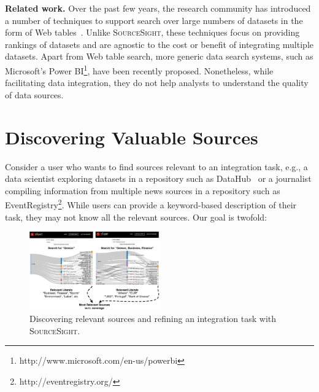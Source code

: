 \documentclass{sig-alternate-05-2015}
\newcommand\system{\textsc{SourceSight}}
\begin{document}
\noindent\textbf{Related work.} Over the past few years, the research community has introduced a number of techniques to support search over large numbers of datasets in the form of Web tables~\cite{limaye:2010,dassarma:2012}. Unlike \system, these techniques focus on providing rankings of datasets and are agnostic to the cost or benefit of integrating multiple datasets. Apart from Web table search, more generic data search systems, such as Microsoft's Power BI\footnote{http://www.microsoft.com/en-us/powerbi}, have been recently proposed. Nonetheless, while facilitating data integration, they do not help analysts to understand the quality of data sources.

\section{Discovering Valuable Sources}
\label{sec:sources}
Consider a user who wants to find sources relevant to an integration task, e.g., a data scientist exploring datasets in a repository such as DataHub~\cite{datahub} or a journalist compiling information from multiple news sources in a repository such as EventRegistry\footnote{http://eventregistry.org/}. While users can provide a keyword-based description of their task, they may not know all the relevant sources. Our goal is twofold: 

\begin{figure}
	\begin{center}
	\includegraphics[trim=0 0 0 60, clip,width=0.50\textwidth]{fig/exploreCor}
	\vspace{-20pt}
	\caption{Discovering relevant sources and refining an integration task with \system.}
	\label{fig:exploration}
	\end{center}
	\vspace{-25pt}
\end{figure}
\end{document}
